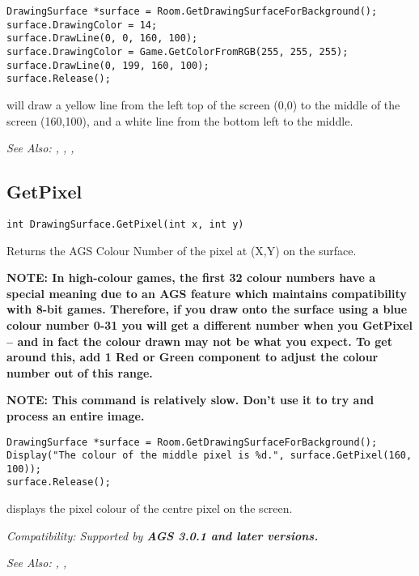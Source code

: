 \begin{verbatim}
DrawingSurface *surface = Room.GetDrawingSurfaceForBackground();
surface.DrawingColor = 14;
surface.DrawLine(0, 0, 160, 100);
surface.DrawingColor = Game.GetColorFromRGB(255, 255, 255);
surface.DrawLine(0, 199, 160, 100);
surface.Release();
\end{verbatim}
will draw a yellow line from the left top of the screen (0,0) to the middle of the screen (160,100),
and a white line from the bottom left to the middle.

\it{See Also:} ,
,
,


\subsection{GetPixel}\label{DrawingSurface.GetPixel}%

\begin{verbatim}
int DrawingSurface.GetPixel(int x, int y)
\end{verbatim}
Returns the AGS Colour Number of the pixel at (X,Y) on the surface.

\bf{NOTE:} In high-colour games, the first 32 colour numbers have a special meaning
due to an AGS feature which maintains compatibility with 8-bit games. Therefore, if
you draw onto the surface using a blue colour number 0-31 you will get a different number
when you GetPixel -- and in fact the colour drawn may not be what you expect.
To get around this, add 1 Red or Green component to adjust the colour number out of this range.

\bf{NOTE:} This command is relatively slow. Don't use it to try and process an entire image.

\begin{verbatim}
DrawingSurface *surface = Room.GetDrawingSurfaceForBackground();
Display("The colour of the middle pixel is %d.", surface.GetPixel(160, 100));
surface.Release();
\end{verbatim}
displays the pixel colour of the centre pixel on the screen.

\it{Compatibility:} Supported by \bf{AGS 3.0.1} and later versions.

\it{See Also:} ,
,


